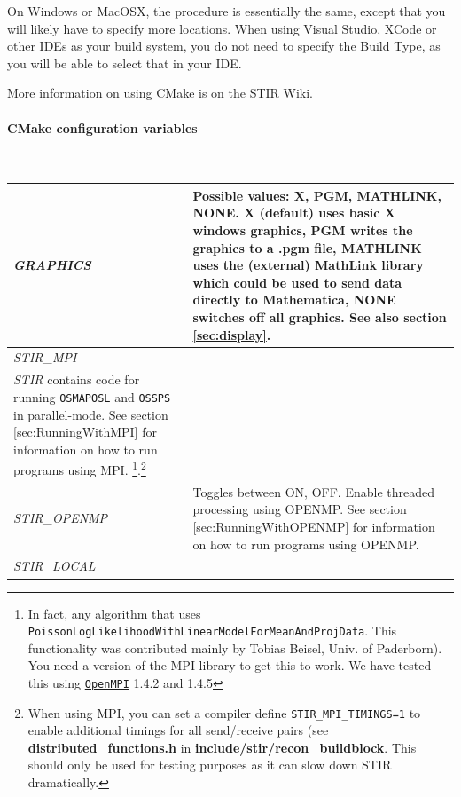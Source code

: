 \documentclass{article}
\def\url#1#2{\mbox{\href{#1}{\tt #2}}}
\newcommand{\subsubsubsection}[1]{\paragraph{#1}\mbox{} \\}
\begin{document}
On Windows or MacOSX, the procedure is essentially the same, except that you will likely have
to specify more locations. When using Visual Studio, XCode or other IDEs as  your build system,
you do not need to specify the Build Type, as you will be able to select that in
your IDE.

More information on using CMake is on the STIR Wiki.

{\subsubsubsection{CMake configuration variables}
}

\newlength{\MakeTableFirstCol}
\newlength{\MakeTableSecondCol}
\setlength{\MakeTableFirstCol}{1.5in}
\setlength{\MakeTableSecondCol}{\textwidth}
\addtolength{\MakeTableSecondCol}{-\MakeTableFirstCol}

\begin{longtable}{|p{\MakeTableFirstCol}|p{\MakeTableSecondCol}|}
\hline
{\raggedright \textit{GRAPHICS}} & 
{\raggedright Possible values: X, PGM, MATHLINK, NONE. X (default) uses basic 
X windows graphics, PGM writes the graphics to a .pgm file, MATHLINK 
uses the (external) MathLink library which could be used to send 
data directly to Mathematica, NONE switches off all graphics. See also section \ref{sec:display}.
} \\
\hline
{\raggedright \textit{STIR\_MPI}} & 
{\raggedright Toggles between ON, OFF. Enable parallel processing using MPI.\\
\textit{STIR} contains code for running \texttt{OSMAPOSL} and \texttt{OSSPS} in parallel-mode. 
See section \ref{sec:RunningWithMPI} for information on how to run programs using MPI.
\footnote{In fact, any algorithm that uses \texttt{PoissonLogLikelihoodWithLinearModelForMeanAndProjData}.
This functionality was contributed mainly by Tobias Beisel, Univ. of Paderborn). You need a version of the MPI library 
to get this to work. We have tested this using \url{http://www.open-mpi.org/}{OpenMPI} 1.4.2 and 1.4.5}.\footnote{
{When using MPI, you can set a compiler define \texttt{STIR\_MPI\_TIMINGS=1}} to
enable additional timings for all send/receive pairs 
(see \textbf{distributed\_functions.h} in \textbf{include/stir/recon\_buildblock}. 
This should only be used for testing purposes as it can slow down
STIR dramatically.}
} \\
\hline
{\raggedright \textit{STIR\_OPENMP}} & 
{\raggedright Toggles between ON, OFF. Enable threaded processing using OPENMP.
See section \ref{sec:RunningWithOPENMP} for information on how to run programs using OPENMP.
} \\
\hline
{\raggedright \textit{STIR\_LOCAL}} & 

\end{longtable}
\end{document}
